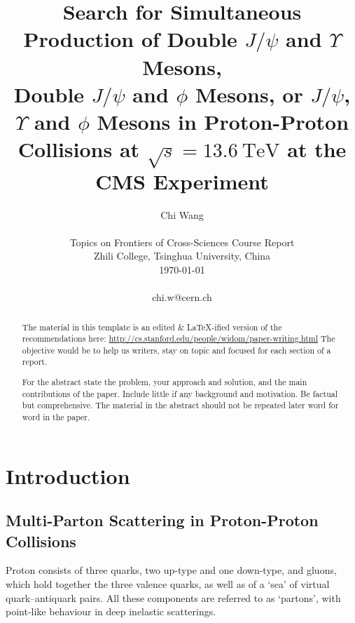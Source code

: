 \documentclass[10pt,twocolumn]{article}
\begin{document}
\title{Search for Simultaneous Production of Double $J/\psi$ and $\Upsilon$ Mesons,\\Double $J/\psi$ and $\phi$ Mesons, or $J/\psi$, $\Upsilon$ and $\phi$ Mesons in Proton-Proton\\ Collisions at $\sqrt{s} = 13.6 ~ \mathrm{TeV}$ at the CMS Experiment}

\author{Chi Wang \\
\\
Topics on Frontiers of Cross-Sciences Course Report \\
Zhili College, Tsinghua University, China \\
\today
\\
\\
chi.w@cern.ch  \\
}

\maketitle
\thispagestyle{empty}

\begin{abstract}
The material in this template is an edited \& \LaTeX\--ified version of the recommendations here: \url{http://cs.stanford.edu/people/widom/paper-writing.html} The objective would be to help us writers, stay on topic and focused for each section of a report.

For the abstract state the problem, your approach and solution, and the main contributions of the paper. Include little if any background and motivation. Be factual but comprehensive. The material in the abstract should not be repeated later word for word in the paper. 
\end{abstract}


\section{Introduction}

\subsection{Multi-Parton Scattering in Proton-Proton Collisions}

Proton consists of three quarks, two up-type and one down-type, and gluons, which hold together the three valence quarks, as well as of a ‘sea’ of virtual quark–antiquark pairs. All these components are referred to as ‘partons’, with point-like behaviour in deep inelastic scatterings.\cite{}
\end{document}
